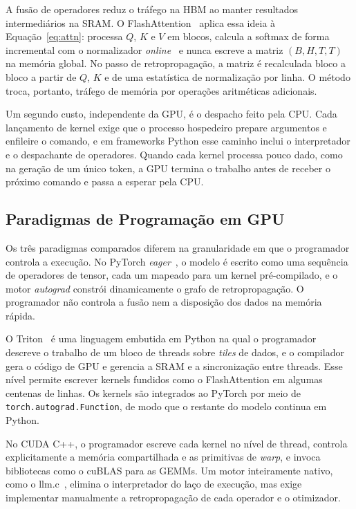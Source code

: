 \documentclass[conference]{IEEEtran}
\begin{document}
A fusão de operadores reduz o tráfego na HBM ao manter resultados intermediários na SRAM. O FlashAttention~\cite{dao2022flashattention,dao2024flashattention2} aplica essa ideia à Equação~\eqref{eq:attn}: processa $Q$, $K$ e $V$ em blocos, calcula a softmax de forma incremental com o normalizador \textit{online}~\cite{milakov2018online} e nunca escreve a matriz $(B,H,T,T)$ na memória global. No passo de retropropagação, a matriz é recalculada bloco a bloco a partir de $Q$, $K$ e de uma estatística de normalização por linha. O método troca, portanto, tráfego de memória por operações aritméticas adicionais.

Um segundo custo, independente da GPU, é o despacho feito pela CPU. Cada lançamento de kernel exige que o processo hospedeiro prepare argumentos e enfileire o comando, e em frameworks Python esse caminho inclui o interpretador e o despachante de operadores. Quando cada kernel processa pouco dado, como na geração de um único token, a GPU termina o trabalho antes de receber o próximo comando e passa a esperar pela CPU.

\subsection{Paradigmas de Programação em GPU}

Os três paradigmas comparados diferem na granularidade em que o programador controla a execução. No PyTorch \textit{eager}~\cite{paszke2019pytorch}, o modelo é escrito como uma sequência de operadores de tensor, cada um mapeado para um kernel pré-compilado, e o motor \textit{autograd} constrói dinamicamente o grafo de retropropagação. O programador não controla a fusão nem a disposição dos dados na memória rápida.

O Triton~\cite{tillet2019triton} é uma linguagem embutida em Python na qual o programador descreve o trabalho de um bloco de threads sobre \textit{tiles} de dados, e o compilador gera o código de GPU e gerencia a SRAM e a sincronização entre threads. Esse nível permite escrever kernels fundidos como o FlashAttention em algumas centenas de linhas. Os kernels são integrados ao PyTorch por meio de \texttt{torch.autograd.Function}, de modo que o restante do modelo continua em Python.

No CUDA C++, o programador escreve cada kernel no nível de thread, controla explicitamente a memória compartilhada e as primitivas de \textit{warp}, e invoca bibliotecas como o cuBLAS para as GEMMs. Um motor inteiramente nativo, como o llm.c~\cite{karpathy2024llmc}, elimina o interpretador do laço de execução, mas exige implementar manualmente a retropropagação de cada operador e o otimizador.
\end{document}
